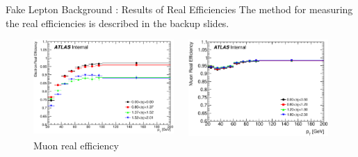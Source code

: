 \documentclass[mathserif,serif]{beamer}
\begin{document}
\begin{frame}{Fake Lepton Background : Results of Real Efficiencies}
The method for measuring the real efficiencies is described in the backup slides.
\begin{figure}
\begin{columns}

\begin{column}{0.5\textwidth}
\includegraphics[width=\textwidth]{data/plot/plotRealEffs/El_hEff.eps}
\caption{Electron real efficiency}
\end{column}

\begin{column}{0.5\textwidth}
\includegraphics[width=\textwidth]{data/plot/plotRealEffs/Mu_hEff.eps}
\caption{Muon real efficiency}
\end{column}

\end{columns}
\end{figure}
\end{frame}
\end{document}
